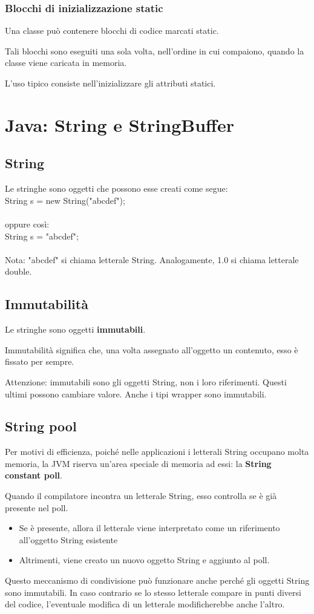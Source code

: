 \documentclass[10pt]{article}
\begin{document}
\subsubsection{Blocchi di inizializzazione static}
Una classe può contenere blocchi di codice marcati static.

Tali blocchi sono eseguiti una sola volta, nell’ordine in cui compaiono, quando la classe viene caricata in memoria.

L’uso tipico consiste nell’inizializzare gli attributi statici.
\section{Java: String e StringBuffer}
\subsection{String}
Le stringhe sono oggetti che possono esse creati come segue:\\

String s = new String("abcdef");\\\\
oppure così:\\

String s = "abcdef";\\\\
Nota: "abcdef" si chiama letterale String. Analogamente, 1.0 si chiama letterale double.
\subsection{Immutabilità}
Le stringhe sono oggetti \textbf{immutabili}.

Immutabilità significa che, una volta assegnato all'oggetto un contenuto, esso è fissato per sempre.

Attenzione: immutabili sono gli oggetti String, non i loro riferimenti. Questi ultimi possono cambiare valore. Anche i tipi wrapper sono immutabili.
\subsection{String pool}
Per motivi di efficienza, poiché nelle applicazioni i letterali String occupano molta memoria, la JVM riserva un'area speciale di memoria ad essi: la \textbf{String constant poll}.

Quando il compilatore incontra un letterale String, esso controlla se è già presente nel poll.
\begin{itemize}
    \item Se è presente, allora il letterale viene interpretato come un riferimento all'oggetto String esistente
    \item Altrimenti, viene creato un nuovo oggetto String e aggiunto al poll.
\end{itemize}
Questo meccanismo di condivisione può funzionare anche perché gli oggetti String sono immutabili.
In caso contrario se lo stesso letterale compare in punti diversi del codice, l’eventuale modifica di un letterale modificherebbe anche l’altro.
\end{document}

